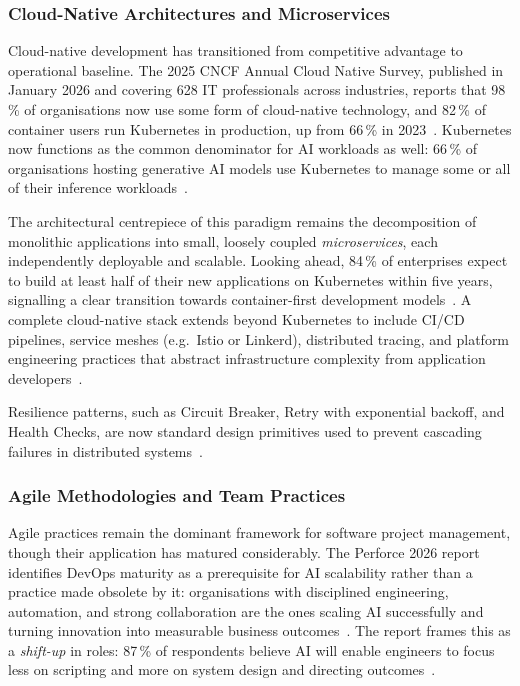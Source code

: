  
\subsubsection{Cloud-Native Architectures and
Microservices}\label{sec:sota:cloud}
 
Cloud-native development has transitioned from competitive advantage
to operational baseline.
The 2025 CNCF Annual Cloud Native Survey, published in January 2026
and covering 628 IT professionals across industries, reports that
98\,\% of organisations now use some form of cloud-native technology,
and 82\,\% of container users run Kubernetes in production, up from
66\,\% in 2023~\cite{cncf2026survey}.
Kubernetes now functions as the common denominator for AI
workloads as well: 66\,\% of organisations hosting generative AI
models use Kubernetes to manage some or all of their inference
workloads~\cite{cncf2026survey}.
 
The architectural centrepiece of this paradigm remains the
decomposition of monolithic applications into small, loosely coupled
\textit{microservices}, each independently deployable and scalable.
Looking ahead, 84\,\% of enterprises expect to build at least half
of their new applications on Kubernetes within five years, signalling
a clear transition towards container-first development
models~\cite{portworx2026}.
A complete cloud-native stack extends beyond Kubernetes to include
CI/CD pipelines, service meshes (e.g.\ Istio or Linkerd),
distributed tracing, and platform engineering practices that abstract
infrastructure complexity from application
developers~\cite{ini8labs2025}.
 
Resilience patterns, such as Circuit Breaker, Retry with exponential
backoff, and Health Checks, are now standard design primitives used
to prevent cascading failures in distributed
systems~\cite{madrigan2025}.
 
 
\subsubsection{Agile Methodologies and Team
Practices}\label{subsub:sota:agile}
 
Agile practices remain the dominant framework for software project
management, though their application has matured considerably.
The Perforce 2026 report identifies DevOps maturity as a
prerequisite for AI scalability rather than a practice made obsolete
by it: organisations with disciplined engineering, automation, and
strong collaboration are the ones scaling AI successfully and
turning innovation into measurable business
outcomes~\cite{perforce2026devops}.
The report frames this as a \textit{shift-up} in roles: 87\,\% of
respondents believe AI will enable engineers to focus less on
scripting and more on system design and directing
outcomes~\cite{perforce2026devops}.
 
